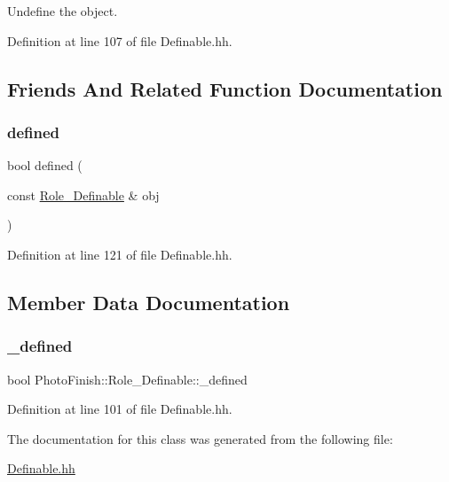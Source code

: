 Undefine the object. 



Definition at line 107 of file Definable.\+hh.



\subsection{Friends And Related Function Documentation}
\mbox{\label{class_photo_finish_1_1_role___definable_a70a3dc85deecd392aac531f24a4b5ca1}} 
\subsubsection{\texorpdfstring{defined}{defined}}
{\footnotesize\ttfamily bool defined (\begin{DoxyParamCaption}\item[{const \hyperlink{class_photo_finish_1_1_role___definable}{Role\+\_\+\+Definable} \&}]{obj }\end{DoxyParamCaption})\hspace{0.3cm}{\ttfamily [friend]}}



Definition at line 121 of file Definable.\+hh.



\subsection{Member Data Documentation}
\mbox{\label{class_photo_finish_1_1_role___definable_afed38bcd4ba076f41f178faad8ed265d}} 
\subsubsection{\texorpdfstring{\+\_\+defined}{\_defined}}
{\footnotesize\ttfamily bool Photo\+Finish\+::\+Role\+\_\+\+Definable\+::\+\_\+defined\hspace{0.3cm}{\ttfamily [protected]}}



Definition at line 101 of file Definable.\+hh.



The documentation for this class was generated from the following file\+:\begin{DoxyCompactItemize}
\item 
\hyperlink{_definable_8hh}{Definable.\+hh}\end{DoxyCompactItemize}

